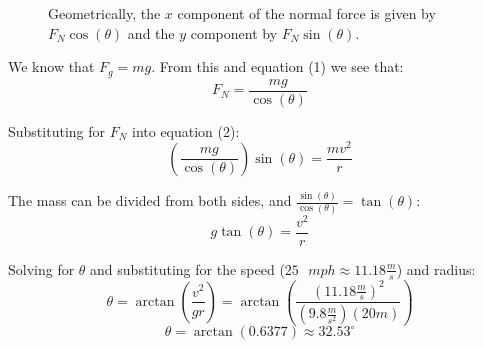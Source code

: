 \begin{figure}
  \caption{Geometrically, the $x$ component of the normal force is given by $F_N \cos{\left( \theta \right)}$ and the $y$ component by $F_N \sin{ \left( \theta \right)}$.}
  \label{fig:banked_component}
\end{figure}

We know that $F_g = mg$. From this and equation (1) we see that:
$$F_N = \frac{mg}{\cos{ \left( \theta \right)}}$$

Substituting for $F_N$ into equation (2):
$$\left( \frac{mg}{\cos{ \left( \theta \right)}} \right) \sin{ \left( \theta \right)} = \frac{mv^2}{r}$$

The mass can be divided from both sides, and $\frac{\sin{ \left( \theta \right)}}{\cos{ \left( \theta \right)}} = \tan{ \left( \theta \right)}$:
$$g \tan{ \left( \theta \right)} = \frac{v^2}{r}$$

Solving for $\theta$ and substituting for the speed ($25 \text{ }mph \approx 11.18 \frac{m}{s}$) and radius:
$$\theta = \arctan{ \left( \frac{v^2}{gr} \right)} = \arctan{ \left( \frac{\left( 11.18 \frac{m}{s} \right)^2}{\left( 9.8 \frac{m}{s^2} \right) \left( 20 m \right)} \right)}$$
$$\theta = \arctan{ \left( 0.6377 \right) } \approx 32.53 ^{\circ}$$


